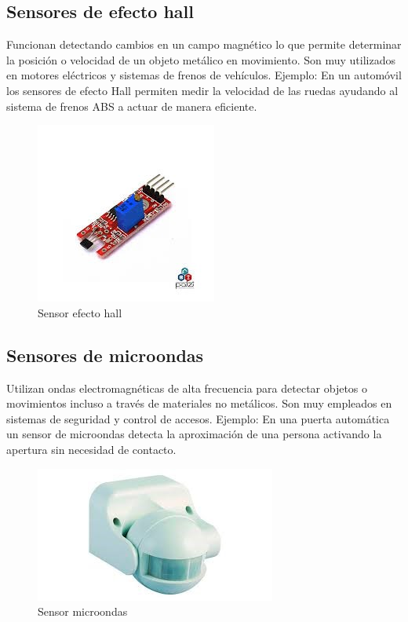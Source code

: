 \subsection{Sensores de efecto hall }
Funcionan detectando cambios en un campo magnético lo que permite determinar la posición o velocidad de un objeto metálico en movimiento. Son muy utilizados en motores eléctricos y sistemas de frenos de vehículos.
Ejemplo: En un automóvil los sensores de efecto Hall permiten medir la velocidad de las ruedas ayudando al sistema de frenos ABS a actuar de manera eficiente.


\begin{figure}[h]
	\centering
	\includegraphics[width=0.7\linewidth]{img/s. efecto hall.jpg}
	\caption{Sensor efecto hall}
	\label{fig:insertarimagen}
\end{figure}

\subsection{Sensores de microondas }
Utilizan ondas electromagnéticas de alta frecuencia para detectar objetos o movimientos incluso a través de materiales no metálicos. Son muy empleados en sistemas de seguridad y control de accesos.
Ejemplo: En una puerta automática un sensor de microondas detecta la aproximación de una persona activando la apertura sin necesidad de contacto.

\begin{figure}[h]
	\centering
	\includegraphics[width=0.7\linewidth]{img/sensor microondas.jpg}
	\caption{Sensor microondas}
	\label{fig:insertarimagen}
\end{figure}

